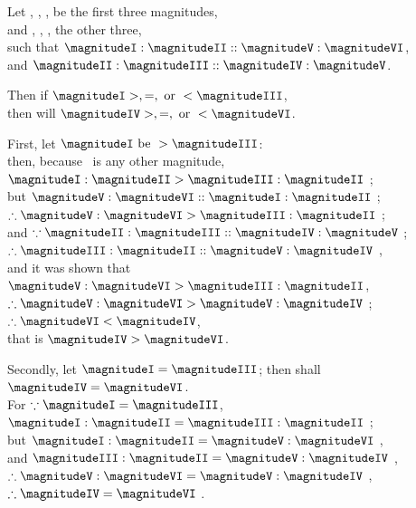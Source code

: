 \documentclass[booklanguage=english]{byrnebook}
\begin{document}
\begin{center}
Let , , , be the first three magnitudes,\\
and , , , the other three,\\
such that $\magnitudeI : \magnitudeII :: \magnitudeV : \magnitudeVI$,\\
and $\magnitudeII : \magnitudeIII :: \magnitudeIV : \magnitudeV$.

Then if $\magnitudeI >, =, \mbox{ or } < \magnitudeIII$,\\
then will $\magnitudeIV >, =, \mbox{ or } < \magnitudeVI$.

First, let $\magnitudeI \mbox{ be } > \magnitudeIII$:\\
then, because \magnitudeII\ is any other magnitude,\\
$\magnitudeI : \magnitudeII > \magnitudeIII : \magnitudeII$ ;\\
but $\magnitudeV : \magnitudeVI :: \magnitudeI : \magnitudeII$ \byref{\hypref};\\
$\therefore \magnitudeV : \magnitudeVI > \magnitudeIII : \magnitudeII$ ;\\
and $\because \magnitudeII : \magnitudeIII :: \magnitudeIV : \magnitudeV$ \byref{\hypref};\\ %
$\therefore \magnitudeIII : \magnitudeII :: \magnitudeV : \magnitudeIV$ ,\\
and it was shown that $\magnitudeV : \magnitudeVI > \magnitudeIII : \magnitudeII$,
$\therefore \magnitudeV : \magnitudeVI > \magnitudeV : \magnitudeIV$ ;\\
$\therefore \magnitudeVI < \magnitudeIV$,\\
that is $\magnitudeIV > \magnitudeVI$.

Secondly, let $\magnitudeI = \magnitudeIII$; then shall $\magnitudeIV = \magnitudeVI$.\\
For $\because \magnitudeI = \magnitudeIII$,\\ %
$\magnitudeI : \magnitudeII = \magnitudeIII : \magnitudeII$ ;\\
but $\magnitudeI : \magnitudeII = \magnitudeV : \magnitudeVI$ \byref{\hypref},\\
and $\magnitudeIII : \magnitudeII = \magnitudeV : \magnitudeIV$ ,\\
$\therefore \magnitudeV : \magnitudeVI = \magnitudeV : \magnitudeIV$ ,\\
$\therefore \magnitudeIV = \magnitudeVI$ .


\end{center}
\end{document}
